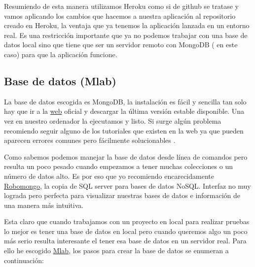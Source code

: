 Resumiendo de esta manera utilizamos Heroku como si de github se tratase y vamos aplicando los cambios que hacemos a nuestra aplicación al repositorio creado en Heroku, la ventaja que ya tenemos la aplicación lanzada en un entorno real. Es una restricción importante que ya no podemos trabajar con una base de datos local sino que tiene que ser un servidor remoto con MongoDB ( en este caso) para que la aplicación funcione.
	

\subsection{Base de datos (Mlab)}
La base de datos escogida es MongoDB, la instalación es fácil y sencilla tan solo hay que ir a la \href{http://www.mongodb.org/downloads}{web} oficial y descargar la última versión estable disponible. Una vez en nuestro ordenador la ejecutamos y listo.  Si surge algún problema recomiendo seguir alguno de los tutoriales que existen en la web ya que pueden aparecen errores comunes pero fácilmente solucionables \cite{tutmongo}.  

Como sabemos podemos manejar la base de datos desde línea de comandos pero resulta un poco pesado cuando empezamos a tener muchas colecciones o un número de datos alto. Es por eso que yo recomiendo encarecidamente  \href{https://robomongo.org/}{Robomongo}, la copia de SQL server para bases de datos NoSQL.  Interfaz no muy lograda pero perfecta para visualizar nuestras bases de datos e información de una manera más intuitiva.

	
	Esta claro que cuando trabajamos con un proyecto en local para realizar pruebas lo mejor es tener una base de datos en local pero cuando queremos algo un poco más serio resulta interesante el tener esa base de datos en un servidor real. Para ello he escogido \href{mlab.com}{Mlab}, los pasos para crear la base de datos se enumeran a continuación: 
	
